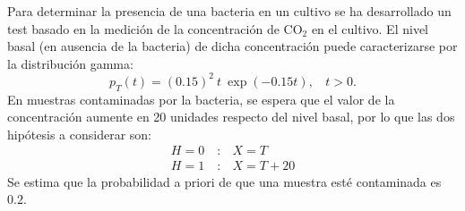 \question[25] %


\ifspanish

Para determinar la presencia de una bacteria en un cultivo se ha desarrollado un test basado en la medición de la concentración de $\text{CO}_2$ en el cultivo. El nivel basal (en ausencia de la bacteria) de dicha concentración puede caracterizarse por la distribución gamma:
$$ p_T(t) = (0.15)^2 ~  t ~  \exp(-0.15 t), ~~~~t > 0. 
$$
En muestras contaminadas por la bacteria, se espera que el valor de la concentración aumente en 20 unidades respecto del nivel basal, por lo que las dos hipótesis a considerar son:
\begin{equation}
\begin{array}{ll}
H=0\quad: & X = T \\
H=1\quad: & X = T + 20
\end{array}
\end{equation}
Se estima que la probabilidad a priori de que una muestra esté contaminada es $0.2$.


